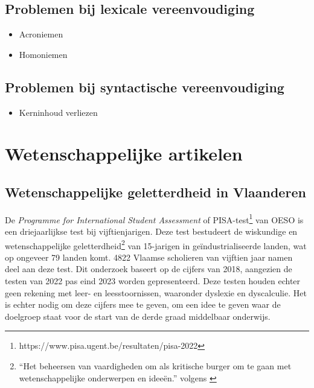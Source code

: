 \subsection{Problemen bij lexicale vereenvoudiging}

\begin{itemize}
	\item Acroniemen
	\item Homoniemen
\end{itemize}

\subsection{Problemen bij syntactische vereenvoudiging}

\begin{itemize}
	\item Kerninhoud verliezen
\end{itemize}

\section{Wetenschappelijke artikelen}

\subsection{Wetenschappelijke geletterdheid in Vlaanderen}

 De \textit{Programme for International Student Assessment} of PISA-test\footnote{https://www.pisa.ugent.be/resultaten/pisa-2022} van OESO is een driejaarlijkse test bij vijftienjarigen. Deze test bestudeert de wiskundige en wetenschappelijke geletterdheid\footnote{“Het beheersen van vaardigheden om als kritische burger om te gaan met wetenschappelijke onderwerpen en ideeën.” volgens \textcite{DeMeyer2019}} van 15-jarigen in geïndustrialiseerde landen, wat op ongeveer 79 landen komt. 4822 Vlaamse scholieren van vijftien jaar namen deel aan deze test. Dit onderzoek baseert op de cijfers van 2018, aangezien de testen van 2022 pas eind 2023 worden gepresenteerd. Deze testen houden echter geen rekening met leer- en leesstoornissen, waaronder dyslexie en dyscalculie. Het is echter nodig om deze cijfers mee te geven, om een idee te geven waar de doelgroep staat voor de start van de derde graad middelbaar onderwijs. 

